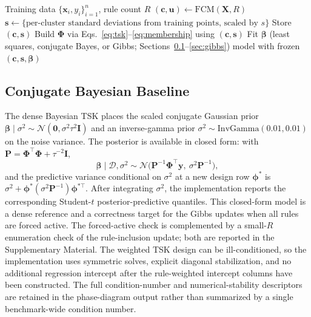 \documentclass[1p,times]{elsarticle}
\begin{document}
\begin{algorithm}[tbhp]
\caption{Corrected TSK training and inference}
\label{alg:tsk}
\begin{algorithmic}[1]
\Require Training data $\{\mathbf{x}_i,y_i\}_{i=1}^n$, rule count $R$
\State $(\mathbf{c},\mathbf{u}) \gets \mathrm{FCM}(\mathbf{X}, R)$ 
\State $\mathbf{s} \gets \{\text{per-cluster standard deviations from training points, scaled by } s\}$
\State Store $(\mathbf{c},\mathbf{s})$ 
\State Build $\boldsymbol{\Phi}$ via Eqs.~\eqref{eq:tsk}--\eqref{eq:membership} using $(\mathbf{c},\mathbf{s})$
\State Fit $\boldsymbol{\beta}$ (least squares, conjugate Bayes, or Gibbs; Sections~\ref{sec:conj}--\ref{sec:gibbs})
\State \Return model with frozen $(\mathbf{c},\mathbf{s},\boldsymbol{\beta})$
\end{algorithmic}
\end{algorithm}

\subsection{Conjugate Bayesian Baseline}
\label{sec:conj}

The dense Bayesian TSK places the scaled conjugate Gaussian prior $\boldsymbol{\beta}\mid\sigma^2\sim\mathcal{N}(\mathbf{0},\sigma^2\tau^2\mathbf{I})$ and an inverse-gamma prior $\sigma^2\sim\mathrm{InvGamma}(0.01,0.01)$ on the noise variance. The posterior is available in closed form: with $\mathbf{P}=\boldsymbol{\Phi}^{\top}\boldsymbol{\Phi}+\tau^{-2}\mathbf{I}$,
\begin{equation}
 \boldsymbol{\beta}\mid\mathcal{D},\sigma^2 \sim \mathcal{N}\big(\mathbf{P}^{-1}\boldsymbol{\Phi}^{\top}\mathbf{y},\ \sigma^2\mathbf{P}^{-1}\big),
\end{equation}
and the predictive variance conditional on $\sigma^2$ at a new design row $\boldsymbol{\phi}^*$ is $\sigma^2 + \boldsymbol{\phi}^*(\sigma^2\mathbf{P}^{-1})\boldsymbol{\phi}^{*\top}$.
After integrating $\sigma^2$, the implementation reports the corresponding Student-$t$ posterior-predictive quantiles.
This closed-form model is a dense reference and a correctness target for the Gibbs updates when all rules are forced active.
The forced-active check is complemented by a small-$R$ enumeration check of the rule-inclusion update; both are reported in the Supplementary Material.
The weighted TSK design can be ill-conditioned, so the implementation uses symmetric solves, explicit diagonal stabilization, and no additional regression intercept after the rule-weighted intercept columns have been constructed.
The full condition-number and numerical-stability descriptors are retained in the phase-diagram output rather than summarized by a single benchmark-wide condition number.
\end{document}
